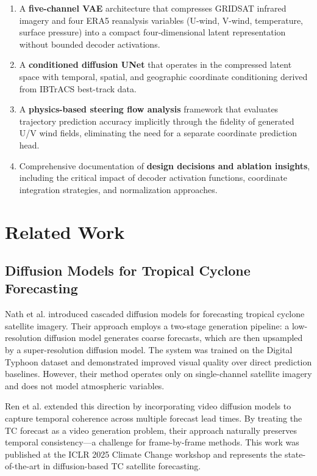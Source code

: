 \documentclass[12pt, a4paper]{article}
\begin{document}
\begin{enumerate}
\item A \textbf{five-channel VAE} architecture that compresses GRIDSAT infrared imagery and four ERA5 reanalysis variables (U-wind, V-wind, temperature, surface pressure) into a compact four-dimensional latent representation without bounded decoder activations.
\item A \textbf{conditioned diffusion UNet} that operates in the compressed latent space with temporal, spatial, and geographic coordinate conditioning derived from IBTrACS best-track data.
\item A \textbf{physics-based steering flow analysis} framework that evaluates trajectory prediction accuracy implicitly through the fidelity of generated U/V wind fields, eliminating the need for a separate coordinate prediction head.
\item Comprehensive documentation of \textbf{design decisions and ablation insights}, including the critical impact of decoder activation functions, coordinate integration strategies, and normalization approaches.
\end{enumerate}

\section{Related Work}

\subsection{Diffusion Models for Tropical Cyclone Forecasting}

Nath et al. \cite{nath2024forecasting} introduced cascaded diffusion models for forecasting tropical cyclone satellite imagery. Their approach employs a two-stage generation pipeline: a low-resolution diffusion model generates coarse forecasts, which are then upsampled by a super-resolution diffusion model. The system was trained on the Digital Typhoon dataset and demonstrated improved visual quality over direct prediction baselines. However, their method operates only on single-channel satellite imagery and does not model atmospheric variables.

Ren et al. \cite{ren2025improving} extended this direction by incorporating video diffusion models to capture temporal coherence across multiple forecast lead times. By treating the TC forecast as a video generation problem, their approach naturally preserves temporal consistency---a challenge for frame-by-frame methods. This work was published at the ICLR 2025 Climate Change workshop and represents the state-of-the-art in diffusion-based TC satellite forecasting.
\end{document}
